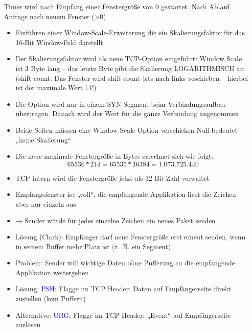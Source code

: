 Timer wird nach Empfang einer Fenstergröße von 0 gestartet.
Nach Ablauf Anfrage nach neuem Fenster (>0)

\begin{itemize}
    \item Einführen einer Window-Scale-Erweiterung die ein Skalierungsfaktor für das 16-Bit Window-Feld darstellt
    \item Der Skalierungsfaktor wird als neue TCP-Option eingeführt: Window Scale ist 3 Byte lang – das letzte Byte gibt die Skalierung LOGARITHMISCH an (shift count: Das Fenster wird shift count bits nach links veschieben – hierbei ist der maximale Wert 14!)
    \item Die Option wird nur in einem SYN-Segment beim Verbindungsaufbau übertragen.
    Danach wird der Wert für die ganze Verbindung angenommen
    \item Beide Seiten müssen eine Window-Scale-Option verschicken Null bedeutet „keine Skalierung“
    \item Die neue maximale Fenstergröße in Bytes errechnet sich wie folgt: \[65536 * 214 = 65535 * 16384 = 1.073.725.440\]
    \item TCP-intern wird die Fenstergröße jetzt als 32-Bit-Zahl verwaltet
\end{itemize}

\begin{itemize}
    \item Empfangsfenster ist „voll“, die empfangende Applikation liest die Zeichen aber nur einzeln aus
    \item → Sender würde für jedes einzelne Zeichen ein neues Paket senden
    \item Lösung (Clark): Empfänger darf neue Fenstergröße erst erneut senden, wenn in seinem Buffer mehr Platz ist (z.\ B. ein Segment)
\end{itemize}

\begin{itemize}
    \item Problem: Sender will wichtige Daten ohne Pufferung an die empfangende Applikation weitergeben
    \item Lösung: \textcolor{blue}{PSH}: Flagge im TCP Header: Daten auf Empfängerseite direkt zustellen (kein Puffern)
    \item Alternative: \textcolor{blue}{URG}: Flagge im TCP Header: „Event“ auf Empfängerseite auslösen
\end{itemize}